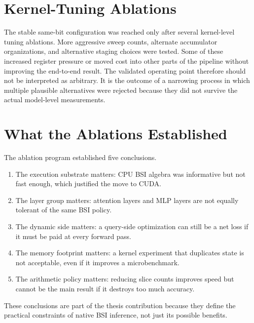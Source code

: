 \section{Kernel-Tuning Ablations}
The stable same-bit configuration was reached only after several kernel-level tuning ablations. More aggressive sweep counts, alternate accumulator organizations, and alternative staging choices were tested. Some of these increased register pressure or moved cost into other parts of the pipeline without improving the end-to-end result. The validated operating point therefore should not be interpreted as arbitrary. It is the outcome of a narrowing process in which multiple plausible alternatives were rejected because they did not survive the actual model-level measurements.

\section{What the Ablations Established}
The ablation program established five conclusions.

\begin{enumerate}[leftmargin=2em]
\item The execution substrate matters: CPU BSI algebra was informative but not fast enough, which justified the move to CUDA.
\item The layer group matters: attention layers and MLP layers are not equally tolerant of the same BSI policy.
\item The dynamic side matters: a query-side optimization can still be a net loss if it must be paid at every forward pass.
\item The memory footprint matters: a kernel experiment that duplicates state is not acceptable, even if it improves a microbenchmark.
\item The arithmetic policy matters: reducing slice counts improves speed but cannot be the main result if it destroys too much accuracy.
\end{enumerate}

These conclusions are part of the thesis contribution because they define the practical constraints of native BSI inference, not just its possible benefits.
